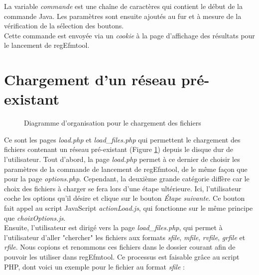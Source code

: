 La variable \textit{commande} est une chaîne de caractères qui contient le début de la commande Java. Les paramètres sont ensuite ajoutés au fur et à mesure de la vérification de la sélection des boutons. \\

Cette commande est envoyée via un \textit{cookie} à la page d'affichage des résultats pour le lancement de regEfmtool. 

\section{Chargement d'un réseau pré-existant}

\begin{figure}[!ht]
	\begin{center}
		\caption{Diagramme d'organisation pour le chargement des fichiers}
  		\label{DiagLoad}
  	\end{center}	
\end{figure}

Ce sont les pages \emph{load.php} et \emph{load\_files.php} qui permettent le chargement des fichiers contenant un réseau pré-existant (Figure \ref{DiagLoad}) depuis le disque dur de l'utilisateur. Tout d'abord, la page \emph{load.php} permet à ce dernier de choisir les paramètres de la commande de lancement de regEfmtool, de le même façon que pour la page \emph{options.php}. Cependant, la deuxième grande catégorie diffère car le choix des fichiers à charger se fera lors d'une étape ultérieure. Ici, l'utilisateur coche les options qu'il désire et clique sur le bouton \textit{Étape suivante}. Ce bouton fait appel au script JavaScript \emph{actionLoad.js}, qui fonctionne sur le même principe que \emph{choixOptions.js}. \\

Ensuite, l'utilisateur est dirigé vers la page \emph{load\_files.php}, qui permet à l'utilisateur d'aller "chercher" les fichiers aux formats \textit{sfile}, \textit{mfile}, \textit{rvfile}, \textit{grfile} et \textit{rfile}. Nous copions et renommons ces fichiers dans le dossier courant afin de pouvoir les utiliser dans regEfmtool. Ce processus est faisable grâce au script PHP, dont voici un exemple pour le fichier au format \textit{sfile} :\\

